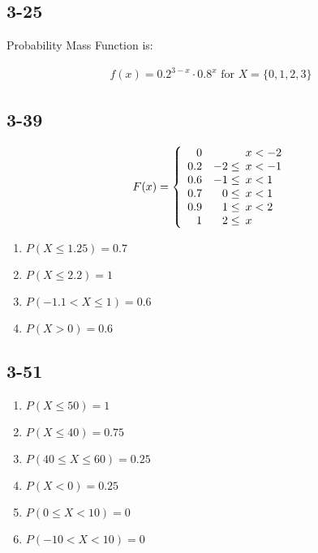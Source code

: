 \documentclass{article}
\begin{document}
\subsection*{3-25}
Probability Mass Function is:

\begin{equation*}
    \begin{aligned}
        f(x) = 0.2^{3-x} \cdot 0.8^x \text{ for } X = \{0, 1, 2, 3\}
    \end{aligned}
\end{equation*}

\subsection*{3-39}

\begin{equation*}
    F(x) = 
    \left\{
        \begin{array}{rr@{\hspace{5pt}}l}
            0   &         & x < -2 \\
            0.2 & -2 \leq & x < -1 \\
            0.6 & -1 \leq & x < 1 \\
            0.7 & 0  \leq & x < 1 \\
            0.9 & 1  \leq & x < 2 \\
            1   & 2  \leq & x
        \end{array}
        \right.
\end{equation*}

\begin{enumerate}[label=(\alph*)]
    \item $P(X \leq 1.25) = 0.7$
    \item $P(X \leq 2.2) = 1$
    \item $P(-1.1 < X \leq 1) = 0.6$
    \item $P(X > 0) = 0.6$
\end{enumerate}

\subsection*{3-51}
\begin{enumerate}[label=(\alph*)]
    \item
        $P(X \leq 50) = 1$
    \item
        $P(X \leq 40) = 0.75$
    \item
        $P(40 \leq X \leq 60) = 0.25$
    \item
        $P(X < 0) = 0.25$
    \item
        $P(0 \leq X < 10) = 0$
    \item
        $P(-10 < X < 10) = 0$
\end{enumerate}
\end{document}
